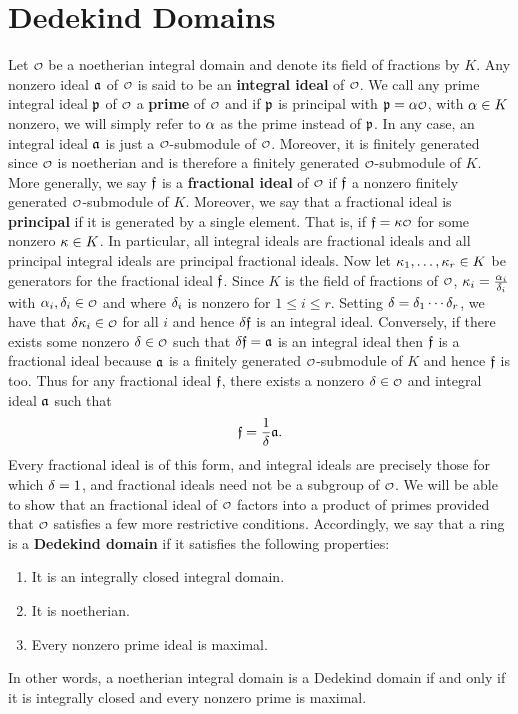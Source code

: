   \section{Dedekind Domains}
    Let $\smc{O}$ be a noetherian integral domain and denote its field of fractions by $K$. Any nonzero ideal $\mathfrak{a}$ of $\smc{O}$ is said to be an \textbf{integral ideal} of $\smc{O}$. We call any prime integral ideal $\mathfrak{p}$ of $\smc{O}$ a \textbf{prime} of $\smc{O}$ and if $\mathfrak{p}$ is principal with $\mf{p} = \a\smc{O}$, with $\alpha \in K$ nonzero, we will simply refer to $\alpha$ as the prime instead of $\mathfrak{p}$. In any case, an integral ideal $\mathfrak{a}$ is just a $\smc{O}$-submodule of $\smc{O}$. Moreover, it is finitely generated since $\smc{O}$ is noetherian and is therefore a finitely generated $\smc{O}$-submodule of $K$. More generally, we say $\mathfrak{f}$ is a \textbf{fractional ideal} of $\smc{O}$ if $\mathfrak{f}$ a nonzero finitely generated $\smc{O}$-submodule of $K$. Moreover, we say that a fractional ideal is \textbf{principal} if it is generated by a single element. That is, if $\mf{f} = \k\smc{O}$ for some nonzero $\kappa \in K$. In particular, all integral ideals are fractional ideals and all principal integral ideals are principal fractional ideals. Now let $\kappa_{1},\ldots,\kappa_{r} \in K$ be generators for the fractional ideal $\mathfrak{f}$. Since $K$ is the field of fractions of $\smc{O}$, $\kappa_{i} = \frac{\alpha_{i}}{\delta_{i}}$ with $\a_{i},\d_{i} \in \smc{O}$ and where $\delta_{i}$ is nonzero for $1 \le i \le r$. Setting $\delta = \delta_{1} \cdots \delta_{r}$, we have that $\d\k_{i} \in \smc{O}$ for all $i$ and hence $\delta\mathfrak{f}$ is an integral ideal. Conversely, if there exists some nonzero $\d \in \smc{O}$ such that $\delta\mathfrak{f} = \mathfrak{a}$ is an integral ideal then $\mathfrak{f}$ is a fractional ideal because $\mathfrak{a}$ is a finitely generated $\smc{O}$-submodule of $K$ and hence $\mathfrak{f}$ is too. Thus for any fractional ideal $\mathfrak{f}$, there exists a nonzero $\d \in \smc{O}$ and integral ideal $\mathfrak{a}$ such that
    \[
      \mathfrak{f} = \frac{1}{\delta}\mathfrak{a}.
    \]
    Every fractional ideal is of this form, and integral ideals are precisely those for which $\delta = 1$, and fractional ideals need not be a subgroup of $\smc{O}$. We will be able to show that an fractional ideal of $\smc{O}$ factors into a product of primes provided that $\smc{O}$ satisfies a few more restrictive conditions. Accordingly, we say that a ring is a \textbf{Dedekind domain} if it satisfies the following properties:
    \begin{enumerate}[label=(\roman*)]
      \item It is an integrally closed integral domain.
      \item It is noetherian.
      \item Every nonzero prime ideal is maximal.
    \end{enumerate}
    In other words, a noetherian integral domain is a Dedekind domain if and only if it is integrally closed and every nonzero prime is maximal.
    

